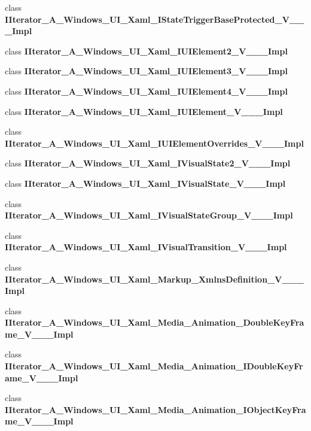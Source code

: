 \begin{DoxyCompactItemize}
\item 
class {\bfseries I\+Iterator\+\_\+\+A\+\_\+\+Windows\+\_\+\+U\+I\+\_\+\+Xaml\+\_\+\+I\+State\+Trigger\+Base\+Protected\+\_\+\+V\+\_\+\+\_\+\+\_\+\+Impl}
\item 
class {\bfseries I\+Iterator\+\_\+\+A\+\_\+\+Windows\+\_\+\+U\+I\+\_\+\+Xaml\+\_\+\+I\+U\+I\+Element2\+\_\+\+V\+\_\+\+\_\+\+\_\+\+Impl}
\item 
class {\bfseries I\+Iterator\+\_\+\+A\+\_\+\+Windows\+\_\+\+U\+I\+\_\+\+Xaml\+\_\+\+I\+U\+I\+Element3\+\_\+\+V\+\_\+\+\_\+\+\_\+\+Impl}
\item 
class {\bfseries I\+Iterator\+\_\+\+A\+\_\+\+Windows\+\_\+\+U\+I\+\_\+\+Xaml\+\_\+\+I\+U\+I\+Element4\+\_\+\+V\+\_\+\+\_\+\+\_\+\+Impl}
\item 
class {\bfseries I\+Iterator\+\_\+\+A\+\_\+\+Windows\+\_\+\+U\+I\+\_\+\+Xaml\+\_\+\+I\+U\+I\+Element\+\_\+\+V\+\_\+\+\_\+\+\_\+\+Impl}
\item 
class {\bfseries I\+Iterator\+\_\+\+A\+\_\+\+Windows\+\_\+\+U\+I\+\_\+\+Xaml\+\_\+\+I\+U\+I\+Element\+Overrides\+\_\+\+V\+\_\+\+\_\+\+\_\+\+Impl}
\item 
class {\bfseries I\+Iterator\+\_\+\+A\+\_\+\+Windows\+\_\+\+U\+I\+\_\+\+Xaml\+\_\+\+I\+Visual\+State2\+\_\+\+V\+\_\+\+\_\+\+\_\+\+Impl}
\item 
class {\bfseries I\+Iterator\+\_\+\+A\+\_\+\+Windows\+\_\+\+U\+I\+\_\+\+Xaml\+\_\+\+I\+Visual\+State\+\_\+\+V\+\_\+\+\_\+\+\_\+\+Impl}
\item 
class {\bfseries I\+Iterator\+\_\+\+A\+\_\+\+Windows\+\_\+\+U\+I\+\_\+\+Xaml\+\_\+\+I\+Visual\+State\+Group\+\_\+\+V\+\_\+\+\_\+\+\_\+\+Impl}
\item 
class {\bfseries I\+Iterator\+\_\+\+A\+\_\+\+Windows\+\_\+\+U\+I\+\_\+\+Xaml\+\_\+\+I\+Visual\+Transition\+\_\+\+V\+\_\+\+\_\+\+\_\+\+Impl}
\item 
class {\bfseries I\+Iterator\+\_\+\+A\+\_\+\+Windows\+\_\+\+U\+I\+\_\+\+Xaml\+\_\+\+Markup\+\_\+\+Xmlns\+Definition\+\_\+\+V\+\_\+\+\_\+\+\_\+\+Impl}
\item 
class {\bfseries I\+Iterator\+\_\+\+A\+\_\+\+Windows\+\_\+\+U\+I\+\_\+\+Xaml\+\_\+\+Media\+\_\+\+Animation\+\_\+\+Double\+Key\+Frame\+\_\+\+V\+\_\+\+\_\+\+\_\+\+Impl}
\item 
class {\bfseries I\+Iterator\+\_\+\+A\+\_\+\+Windows\+\_\+\+U\+I\+\_\+\+Xaml\+\_\+\+Media\+\_\+\+Animation\+\_\+\+I\+Double\+Key\+Frame\+\_\+\+V\+\_\+\+\_\+\+\_\+\+Impl}
\item 
class {\bfseries I\+Iterator\+\_\+\+A\+\_\+\+Windows\+\_\+\+U\+I\+\_\+\+Xaml\+\_\+\+Media\+\_\+\+Animation\+\_\+\+I\+Object\+Key\+Frame\+\_\+\+V\+\_\+\+\_\+\+\_\+\+Impl}

\end{DoxyCompactItemize}
